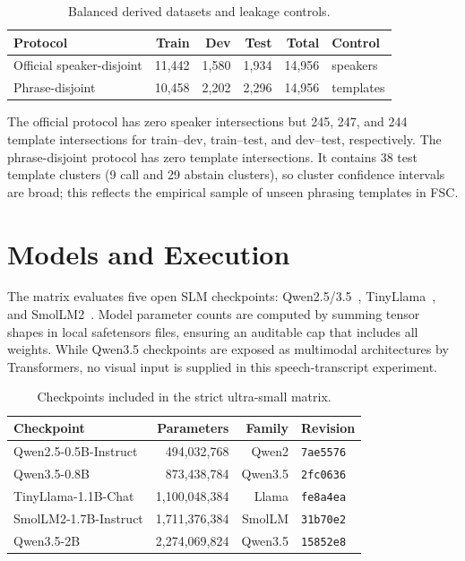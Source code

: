 \documentclass[12pt]{article}
\begin{document}
\begin{table}[ht]
\centering
\caption{Balanced derived datasets and leakage controls.}
\label{tab:splits}
\small
\begin{tabular}{lrrrrl}
\toprule
\textbf{Protocol} & \textbf{Train} & \textbf{Dev} & \textbf{Test} & \textbf{Total} & \textbf{Control} \\
\midrule
Official speaker-disjoint & 11,442 & 1,580 & 1,934 & 14,956 & speakers \\
Phrase-disjoint & 10,458 & 2,202 & 2,296 & 14,956 & templates \\
\bottomrule
\end{tabular}
\end{table}

The official protocol has zero speaker intersections but 245, 247, and 244 template intersections for train--dev, train--test, and dev--test, respectively. The phrase-disjoint protocol has zero template intersections. It contains 38 test template clusters (9 call and 29 abstain clusters), so cluster confidence intervals are broad; this reflects the empirical sample of unseen phrasing templates in FSC.

\section{Models and Execution}

The matrix evaluates five open SLM checkpoints: Qwen2.5/3.5~\cite{qwen35}, TinyLlama~\cite{tinyllama2024}, and SmolLM2~\cite{smollm2025}. Model parameter counts are computed by summing tensor shapes in local safetensors files, ensuring an auditable cap that includes all weights. While Qwen3.5 checkpoints are exposed as multimodal architectures by Transformers, no visual input is supplied in this speech-transcript experiment.

\begin{table}[ht]
\centering
\caption{Checkpoints included in the strict ultra-small matrix.}
\label{tab:models}
\scriptsize
\begin{tabular}{lrrl}
\toprule
\textbf{Checkpoint} & \textbf{Parameters} & \textbf{Family} & \textbf{Revision} \\
\midrule
Qwen2.5-0.5B-Instruct & 494,032,768 & Qwen2 & \texttt{7ae5576} \\
Qwen3.5-0.8B & 873,438,784 & Qwen3.5 & \texttt{2fc0636} \\
TinyLlama-1.1B-Chat & 1,100,048,384 & Llama & \texttt{fe8a4ea} \\
SmolLM2-1.7B-Instruct & 1,711,376,384 & SmolLM & \texttt{31b70e2} \\
Qwen3.5-2B & 2,274,069,824 & Qwen3.5 & \texttt{15852e8} \\
\bottomrule
\end{tabular}
\end{table}
\end{document}
